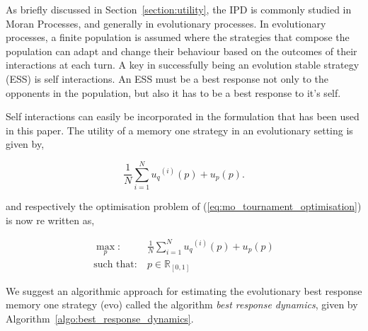 \documentclass[10pt]{article}
\newcommand{\R}{\mathbb{R}}
\begin{document}
As briefly discussed in Section~\ref{section:utility}, the IPD is commonly
studied in Moran Processes, and generally in evolutionary processes. In
evolutionary processes, a finite population is assumed where the strategies that
compose the population can adapt and change their behaviour based on the
outcomes of their interactions at each turn. A key in successfully being an
evolution stable strategy (ESS) is self interactions. An ESS must be a best
response not only to the opponents in the population, but also it has to be a
best response to it's self.

Self interactions can easily be incorporated in the formulation that has been used
in this paper. The utility of a memory one strategy in an evolutionary setting
is given by,

\begin{equation}
    \frac{1}{N} \sum\limits_{i=1} ^ {N} {u_q}^{(i)} (p) + u_p(p).
\end{equation}

and respectively the optimisation problem of (\ref{eq:mo_tournament_optimisation})
is now re written as,

\begin{equation}\label{eq:mo_evolutionary_optimisation}
    \begin{aligned}
    \max_p: & \ \frac{1}{N} \sum\limits_{i=1} ^ {N} {u_q}^{(i)} (p) + u_p(p)
    \\
    \text{such that}: & \ p \in \R_{[0, 1]}
    \end{aligned}
\end{equation}

We suggest an algorithmic approach for estimating the evolutionary best response memory
one strategy (evo) called the algorithm \textit{best response dynamics}, given
by Algorithm~\ref{algo:best_response_dynamics}.
\end{document}
